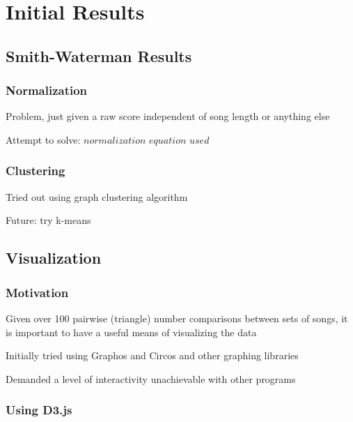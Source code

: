 \chapter{Initial Results}

\section{Smith-Waterman Results}

\subsection{Normalization}

\item Problem, just given a raw score independent of song length or anything else

\item Attempt to solve: $normalization$ $equation$ $used$

\subsection{Clustering}

\item Tried out using graph clustering algorithm

\item Future: try k-means

\section{Visualization}

\subsection{Motivation}

\item Given over 100 pairwise (triangle) number comparisons between sets of songs, it is important to have a useful means of visualizing the data

\item Initially tried using Graphos and Circos and other graphing libraries

\item Demanded a level of interactivity unachievable with other programs

\subsection{Using D3.js}

